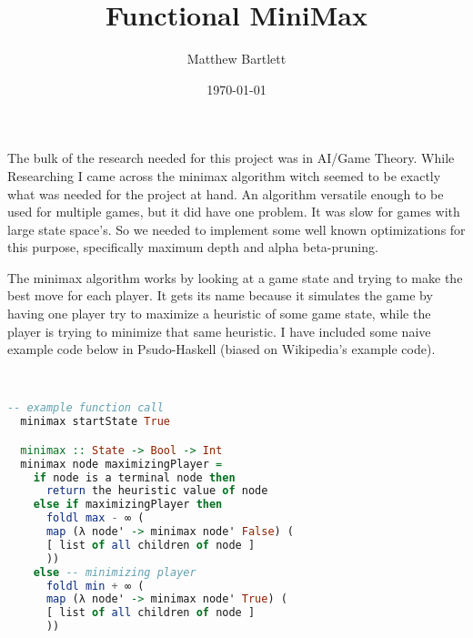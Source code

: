 \documentclass[12pt]{article}
\begin{document}
  \author{Matthew Bartlett}
  \title{Functional MiniMax}
  \date{\today}
  \maketitle

  \begin{paragraph}
  \qquad The bulk of the research needed for this project was in AI/Game Theory. While Researching I came across the minimax\textsuperscript{\cite{MiniMax}} algorithm witch seemed to be exactly what was needed for the project at hand. An algorithm versatile enough to be used for multiple games, but it did have one problem. It was slow for games with large state space's. So we needed to implement some well known optimizations for this purpose, specifically maximum depth and alpha beta-pruning.
  \end{paragraph}

  \begin{paragraph}
  \qquad The minimax algorithm works by looking at a game state and trying to make the best move for each player. It gets its name because it simulates the game by having one player try to maximize a heuristic of some game state, while the player is trying to minimize that same heuristic. I have included some naive example code below in Psudo-Haskell (biased on Wikipedia's example code\textsuperscript{\cite{MiniMaxWiki}}).
  \end{paragraph}\\

  \begin{footnotesize} 
  \begin{lstlisting}[language=Haskell]
  -- example function call
  minimax startState True 

  minimax :: State -> Bool -> Int
  minimax node maximizingPlayer =
    if node is a terminal node then
      return the heuristic value of node
    else if maximizingPlayer then
      foldl max - ∞ (
      map (λ node' -> minimax node' False) (
      [ list of all children of node ]
      ))
    else -- minimizing player
      foldl min + ∞ (
      map (λ node' -> minimax node' True) (
      [ list of all children of node ]
      ))
  \end{lstlisting}
  \end{footnotesize}
\end{document}
